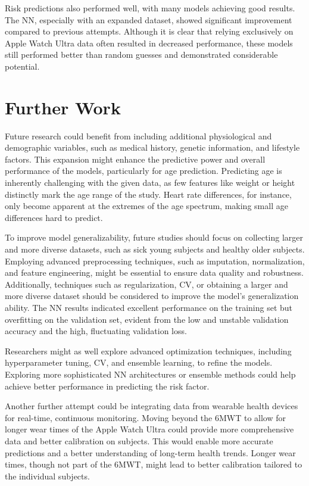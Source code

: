 Risk predictions also performed well, with many models achieving good results. The NN, especially with an expanded dataset, showed significant improvement compared to previous attempts. Although it is clear that relying exclusively on Apple Watch Ultra data often resulted in decreased performance, these models still performed better than random guesses and demonstrated considerable potential.

\section{Further Work}

Future research could benefit from including additional physiological and demographic variables, such as medical history, genetic information, and lifestyle factors. This expansion might enhance the predictive power and overall performance of the models, particularly for age prediction. Predicting age is inherently challenging with the given data, as few features like weight or height distinctly mark the age range of the study. Heart rate differences, for instance, only become apparent at the extremes of the age spectrum, making small age differences hard to predict.

To improve model generalizability, future studies should focus on collecting larger and more diverse datasets, such as sick young subjects and healthy older subjects. Employing advanced preprocessing techniques, such as imputation, normalization, and feature engineering, might be essential to ensure data quality and robustness. Additionally, techniques such as regularization, CV, or obtaining a larger and more diverse dataset should be considered to improve the model's generalization ability. The NN results indicated excellent performance on the training set but overfitting on the validation set, evident from the low and unstable validation accuracy and the high, fluctuating validation loss.

Researchers might as well explore advanced optimization techniques, including hyperparameter tuning, CV, and ensemble learning, to refine the models. Exploring more sophisticated NN architectures or ensemble methods could help achieve better performance in predicting the risk factor. 

Another further attempt could be integrating data from wearable health devices for real-time, continuous monitoring. Moving beyond the 6MWT to allow for longer wear times of the Apple Watch Ultra could provide more comprehensive data and better calibration on subjects. This would enable more accurate predictions and a better understanding of long-term health trends. Longer wear times, though not part of the 6MWT, might lead to better calibration tailored to the individual subjects.

